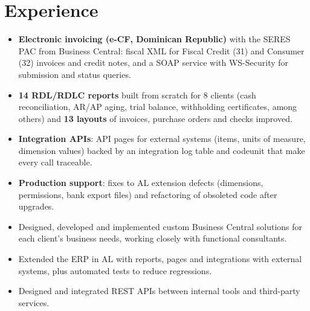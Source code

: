 \documentclass[10pt]{article}
\begin{document}
\section*{Experience}
\begin{itemize}
  \item \textbf{Electronic invoicing (e-CF, Dominican Republic)} with the SERES PAC from Business Central: fiscal XML for Fiscal Credit (31) and Consumer (32) invoices and credit notes, and a SOAP service with WS-Security for submission and status queries.
  \item \textbf{14 RDL/RDLC reports} built from scratch for 8 clients (cash reconciliation, AR/AP aging, trial balance, withholding certificates, among others) and \textbf{13 layouts} of invoices, purchase orders and checks improved.
  \item \textbf{Integration APIs}: API pages for external systems (items, units of measure, dimension values) backed by an integration log table and codeunit that make every call traceable.
  \item \textbf{Production support}: fixes to AL extension defects (dimensions, permissions, bank export files) and refactoring of obsoleted code after upgrades.
\end{itemize}
\begin{itemize}
  \item Designed, developed and implemented custom Business Central solutions for each client's business needs, working closely with functional consultants.
  \item Extended the ERP in AL with reports, pages and integrations with external systems, plus automated tests to reduce regressions.
\end{itemize}
\begin{itemize}
  \item Designed and integrated REST APIs between internal tools and third-party services.
\end{itemize}
\end{document}
